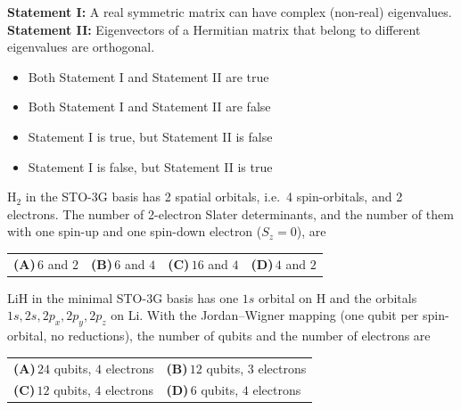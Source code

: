 \documentclass[11pt,a4paper]{article}
\newcommand{\optlabel}[1]{\textbf{(#1)}}
\newenvironment{qitem}[1]{\begin{list}{}{\setlength{\leftmargin}{3.3em}\setlength{\labelwidth}{3.1em}%
  \setlength{\labelsep}{0.2em}\setlength{\topsep}{3pt}\setlength{\parsep}{3pt}}\item[\textbf{Q.#1}\hfill]}{\end{list}}
\newcommand{\qsep}{\par\vspace{2pt}{\color{black!15}\hrule}\vspace{4pt}}
\begin{document}
\begin{qitem}{8}
\textbf{Statement I:} A real symmetric matrix can have complex (non-real) eigenvalues.\\[1mm]
\textbf{Statement II:} Eigenvectors of a Hermitian matrix that belong to different eigenvalues are orthogonal.
\begin{itemize}[leftmargin=2.6em, labelsep=0.4em, itemsep=2pt, topsep=3pt]
\item[\optlabel{A}] Both Statement I and Statement II are true
\item[\optlabel{B}] Both Statement I and Statement II are false
\item[\optlabel{C}] Statement I is true, but Statement II is false
\item[\optlabel{D}] Statement I is false, but Statement II is true
\end{itemize}
\end{qitem}
\qsep

\begin{qitem}{9}
H$_2$ in the STO-3G basis has 2 spatial orbitals, i.e.\ 4 spin-orbitals, and 2 electrons. The number of 2-electron Slater determinants,
and the number of them with one spin-up and one spin-down electron ($S_z = 0$), are
\par\smallskip\noindent\begin{tabularx}{\linewidth}{@{}*{4}{L}@{}}
\optlabel{A}\,$6$ and $2$ & \optlabel{B}\,$6$ and $4$ & \optlabel{C}\,$16$ and $4$ & \optlabel{D}\,$4$ and $2$
\end{tabularx}
\end{qitem}
\qsep

\begin{qitem}{10}
LiH in the minimal STO-3G basis has one $1s$ orbital on H and the orbitals $1s, 2s, 2p_x, 2p_y, 2p_z$ on Li. With the Jordan--Wigner
mapping (one qubit per spin-orbital, no reductions), the number of qubits and the number of electrons are
\par\smallskip\noindent\begin{tabularx}{\linewidth}{@{}*{2}{L}@{}}
\optlabel{A}\,$24$ qubits, $4$ electrons & \optlabel{B}\,$12$ qubits, $3$ electrons \\[3pt]
\optlabel{C}\,$12$ qubits, $4$ electrons & \optlabel{D}\,$6$ qubits, $4$ electrons
\end{tabularx}
\end{qitem}
\qsep
\end{document}

